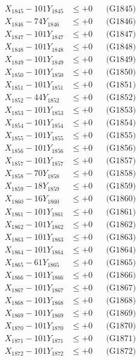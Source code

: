 \documentclass[a4paper,10pt]{article}
\begin{document}
{\begin{align}
X_{1845} - 101Y_{1845} &\leq +0 && \text{(G1845)} \\
X_{1846} - 74Y_{1846} &\leq +0 && \text{(G1846)} \\
X_{1847} - 101Y_{1847} &\leq +0 && \text{(G1847)} \\
X_{1848} - 101Y_{1848} &\leq +0 && \text{(G1848)} \\
X_{1849} - 101Y_{1849} &\leq +0 && \text{(G1849)} \\
X_{1850} - 101Y_{1850} &\leq +0 && \text{(G1850)} \\
\allowbreak
X_{1851} - 101Y_{1851} &\leq +0 && \text{(G1851)} \\
X_{1852} - 44Y_{1852} &\leq +0 && \text{(G1852)} \\
X_{1853} - 101Y_{1853} &\leq +0 && \text{(G1853)} \\
X_{1854} - 101Y_{1854} &\leq +0 && \text{(G1854)} \\
X_{1855} - 101Y_{1855} &\leq +0 && \text{(G1855)} \\
X_{1856} - 101Y_{1856} &\leq +0 && \text{(G1856)} \\
X_{1857} - 101Y_{1857} &\leq +0 && \text{(G1857)} \\
X_{1858} - 70Y_{1858} &\leq +0 && \text{(G1858)} \\
X_{1859} - 18Y_{1859} &\leq +0 && \text{(G1859)} \\
X_{1860} - 16Y_{1860} &\leq +0 && \text{(G1860)} \\
\allowbreak
X_{1861} - 101Y_{1861} &\leq +0 && \text{(G1861)} \\
X_{1862} - 101Y_{1862} &\leq +0 && \text{(G1862)} \\
X_{1863} - 101Y_{1863} &\leq +0 && \text{(G1863)} \\
X_{1864} - 101Y_{1864} &\leq +0 && \text{(G1864)} \\
X_{1865} - 61Y_{1865} &\leq +0 && \text{(G1865)} \\
X_{1866} - 101Y_{1866} &\leq +0 && \text{(G1866)} \\
X_{1867} - 101Y_{1867} &\leq +0 && \text{(G1867)} \\
X_{1868} - 101Y_{1868} &\leq +0 && \text{(G1868)} \\
X_{1869} - 101Y_{1869} &\leq +0 && \text{(G1869)} \\
X_{1870} - 101Y_{1870} &\leq +0 && \text{(G1870)} \\
\allowbreak
X_{1871} - 101Y_{1871} &\leq +0 && \text{(G1871)} \\
X_{1872} - 101Y_{1872} &\leq +0 && \text{(G1872)} \\

\end{align}}
\end{document}
